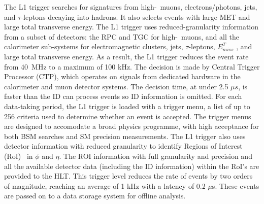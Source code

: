 The L1 trigger searches for signatures from high-\pt\ muons, electrons/photons, jets, and 
\mbox{$\tau$-leptons} decaying into hadrons. It also selects events with large MET
and large total transverse energy. The L1 trigger uses reduced-granularity information from a
subset of detectors: the RPC and TGC for high-\pt\ muons, and all the calorimeter 
sub-systems for electromagnetic clusters, jets, $\tau$-leptons, $E_{miss}^T$ ,
and large total transverse energy.
As a result, the L1 trigger reduces the event rate from 40~MHz to a maximum of 100 kHz.
The decision is made by Central Trigger	Processor (CTP), 
which operates on signals from dedicated hardware in the calorimeter
and muon detector systems. The decision time, at under 2.5 $\mu s$, is faster than the ID
can process events so ID information is omitted.
For each data-taking period, the L1	trigger is loaded with a trigger menu, 
a list of up to 256 criteria used to determine
whether an event is accepted. The trigger menus are designed to accomodate a broad
physics programme, with high acceptance for both BSM searches and SM precision
measurements.
The L1 trigger also uses detector information with reduced granularity to identify Regions
of Interest (RoI)~\cite{Blair:2007qn} in $\phi$ and $\eta$.
The ROI information with full granularity and precision and all the available detector 
data (including the ID information) within the RoI’s are provided to the HLT. 
This trigger level reduces the rate of events by two orders of magnitude,
reaching an average of 1 kHz with a latency of 0.2 $\mu$s.
These events are passed on to a data storage system for offline analysis.


